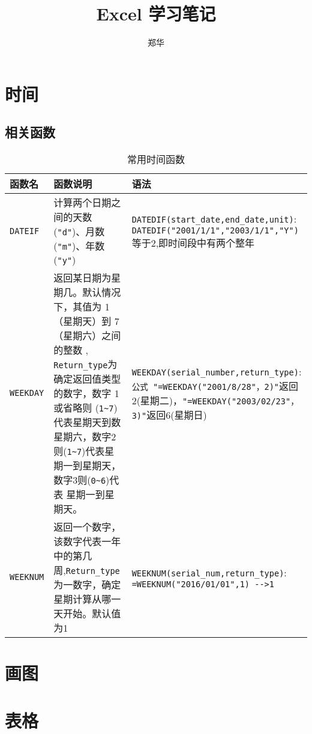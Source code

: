\documentclass[UTF8,a4paper,12pt]{ctexbook}
\author{\kaishu 郑华}
\title{\heiti Excel 学习笔记}
\begin{document}
 	\maketitle
	\tableofcontents
	
\chapter{时间}
	\section{相关函数}
		\begin{table}[h]
			\centering
			\begin{tabular}{|m{2cm}|m{6cm}|m{9cm}|}	
				\hline
				 函数名    & 函数说明 & 语法 \\
				
				\hline
				 \verb|DATEIF| 	  & 计算两个日期之间的天数(\verb|"d"|)、月数(\verb|"m"|)、年数(\verb|"y"|) 	  & \verb|DATEDIF(start_date,end_date,unit)|: \verb|DATEDIF("2001/1/1","2003/1/1","Y")|等于2,即时间段中有两个整年\\
				
				\hline
				 \verb|WEEKDAY|	  & 返回某日期为星期几。默认情况下，其值为 1（星期天）到 7（星期六）之间的整数 ,
				 \verb|Return_type|为确定返回值类型的数字，数字 1或省略则 (\verb|1~7|) 代表星期天到数星期六，数字2则(\verb|1~7|)代表星期一到星期天，数字3则(\verb|0~6|)代表 星期一到星期天。
				  &\verb|WEEKDAY(serial_number,return_type)|: \verb|公式 "=WEEKDAY("2001/8/28"，2)"|返回2(星期二)，\verb|"=WEEKDAY("2003/02/23"，3)"|返回6(星期日) \\
				
				\hline
				\verb|WEEKNUM|	  & 返回一个数字，该数字代表一年中的第几周,\verb|Return_type|
				为一数字，确定星期计算从哪一天开始。默认值为1
				&\verb|WEEKNUM(serial_num,return_type)|: \verb|=WEEKNUM("2016/01/01",1) -->1| \\
				\hline
			\end{tabular}
			\caption{常用时间函数}
		\end{table} 
\chapter{画图}

\chapter{表格}

	    
\end{document}
